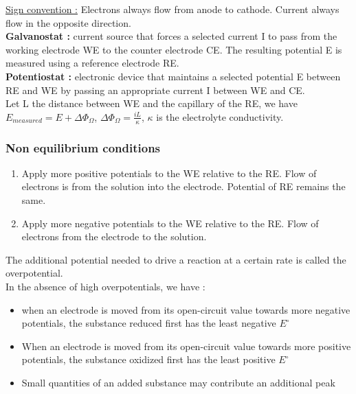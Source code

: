 \documentclass[../main.tex]{subfiles}
\begin{document}
\quad \underline{Sign convention :} Electrons always flow from anode to cathode. Current always flow in the opposite direction. \\

\textbf{Galvanostat :} current source that forces a selected current I to pass from the working electrode WE to the counter electrode CE. The resulting potential E is measured using a reference electrode RE. \\
\textbf{Potentiostat :} electronic device that maintains a selected potential E between RE and WE by passing an appropriate current I between WE and CE.\\

Let L the distance between WE and the capillary of the RE, we have $E_{measured} = E + \Delta \Phi_\Omega$, $\Delta \Phi_\Omega = \frac{iL}{\kappa}$, $\kappa$ is the electrolyte conductivity.\\

\subsubsection{Non equilibrium conditions}
\begin{enumerate}
    \item Apply more positive potentials to the WE relative to the RE. Flow of electrons is from the solution into the electrode. Potential of RE remains the same.
    \item Apply more negative potentials to the WE relative to the RE. Flow of electrons from the electrode to the solution.
\end{enumerate}

The additional potential needed to drive a reaction at a certain rate is called the overpotential.\\

In the absence of high overpotentials, we have : \begin{itemize}
    \item when an electrode is moved from its open-circuit value towards more negative potentials, the substance reduced first has the least negative $E^\circ$
    \item When an electrode is moved from its open-circuit value towards more positive potentials,  the substance oxidized first has the least positive $E^\circ$
    \item Small quantities of an added substance may contribute an additional peak
\end{itemize}
\end{document}

